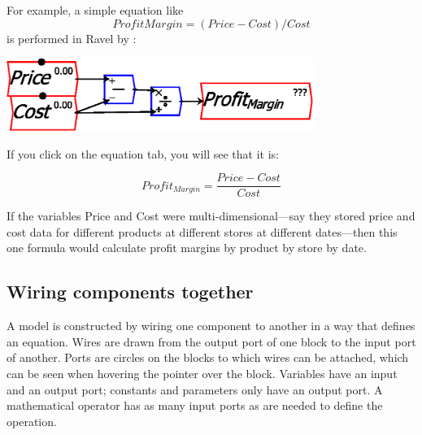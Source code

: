 For example, a simple equation like 
\[
ProfitMargin=(Price-Cost)/Cost
\]
is performed in Ravel by :
\begin{center}
\includegraphics[width=10cm]{images/ProfitMarginEquation} 
\par\end{center}

If you click on the equation tab, you will see that it is:

\[
Profit_{Margin}=\frac{Price-Cost}{Cost}
\]

If the variables Price and Cost were multi-dimensional---say they
stored price and cost data for different products at different stores
at different dates---then this one formula would calculate profit
margins by product by store by date.

\subsection{Wiring components together}

A model is constructed by wiring one component to another in a way
that defines an equation. Wires are drawn from the output port of
one block to the input port of another. Ports are circles on the blocks
to which wires can be attached, which can be seen when hovering the
pointer over the block. Variables have an input and an output port;
constants and parameters only have an output port. A mathematical
operator has as many input ports as are needed to define the operation.
